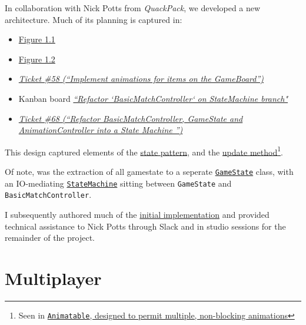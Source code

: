 \documentclass[11pt,a4paper]{report}
\begin{document}
In collaboration with Nick Potts from \textit{QuackPack}, we developed a new architecture. Much of its planning is captured in:

\begin{itemize}
    \item \hyperref[DFD]{Figure 1.1}
    \item \hyperref[StateTransitionGraph]{Figure 1.2}
    \item \href{https://github.com/UQdeco2800/deco2800-2016-pyramidscheme/issues/58}{\textit{Ticket \#58 (``Implement animations for items on the GameBoard'')}}
    \item Kanban board \href{https://github.com/UQdeco2800/deco2800-2016-pyramidscheme/projects/1}{\textit{``Refactor `BasicMatchController` on StateMachine branch"}}
    \item \href{https://github.com/UQdeco2800/deco2800-2016-pyramidscheme/issues/68}{\textit{Ticket \#68 (``Refactor BasicMatchController, GameState and AnimationController into a State Machine '')}}
\end{itemize}


This design captured elements of the \href{http://gameprogrammingpatterns.com/state.html}{state pattern}, and the \href{http://gameprogrammingpatterns.com/update-method.html#passing-time}{update method}\footnote{Seen in \href{https://github.com/UQdeco2800/deco2800-2016-pyramidscheme/blob/StateMachine/pyramidscheme/src/main/java/uq/deco2800/pyramidscheme/controllers/Animations/Animatable.java}{\texttt{Animatable}, designed to permit multiple, non-blocking animations}}. 

Of note, was the extraction of all gamestate to a seperate \href{https://github.com/UQdeco2800/deco2800-2016-pyramidscheme/blob/master/pyramidscheme/src/main/java/uq/deco2800/pyramidscheme/game/GameState.java}{\texttt{GameState}} class, with an IO-mediating \href{https://github.com/UQdeco2800/deco2800-2016-pyramidscheme/tree/master/pyramidscheme/src/main/java/uq/deco2800/pyramidscheme/controllers/statemachine}{\texttt{StateMachine}} sitting between \texttt{GameState} and \texttt{BasicMatchController}.

I subsequently authored much of the \href{https://github.com/UQdeco2800/deco2800-2016-pyramidscheme/commit/a2a1a75c683d5bb9fe5d4cf7cc09bdd47d149507}{initial implementation} and provided technical assistance to Nick Potts through Slack and in studio sessions for the remainder of the project.

\section{Multiplayer}
\end{document}

